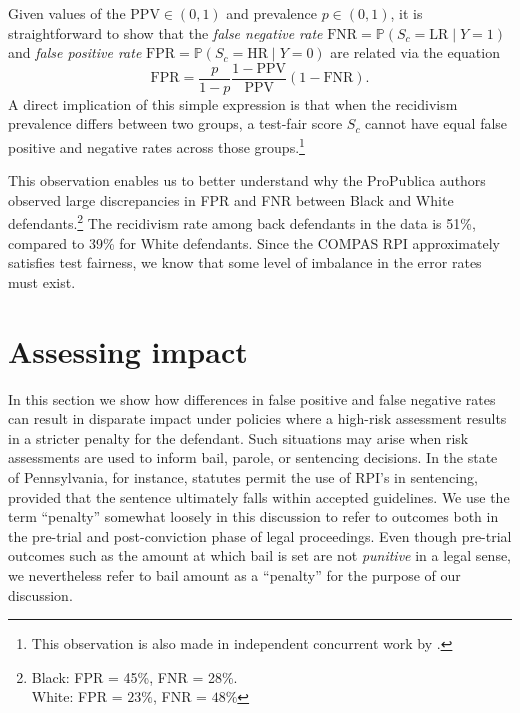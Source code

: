 \documentclass[11pt, svgnames, twocolumn]{article}
\renewcommand{\P}{\mathbb{P}}
\newcommand{\ppv}{\mathrm{PPV}}
\newcommand{\fpr}{\mathrm{FPR}}
\newcommand{\fnr}{\mathrm{FNR}}
\numberwithin{equation}{section}
\theoremstyle{plain}
\theoremstyle{definition}
\numberwithin{theorem}{section}
\numberwithin{prop}{section}
\numberwithin{corollary}{section}
\numberwithin{definition}{section}
\begin{document}
Given values of the $\ppv \in (0,1)$ and prevalence $p \in (0,1)$, it is straightforward to show that the \emph{false negative rate} \mbox{$\fnr = \P(S_c = \text{LR} \mid Y = 1)$} and \emph{false positive rate} \mbox{$\fpr = \P(S_c = \text{HR} \mid Y = 0)$} are related via the equation
\begin{equation}
  \fpr = \frac{p}{1 - p} \frac{1 - \ppv}{\ppv} ( 1 - \fnr).  
  \label{eq:fpr_fnr}
\end{equation}
A direct implication of this simple expression is that when the recidivism prevalence differs between two groups, a test-fair score $S_c$ cannot have equal false positive and negative rates across those groups.\footnote{This observation is also made in independent concurrent work by \citet{kleinberg2016inherent}. }  
  
This observation enables us to better understand why the ProPublica authors observed  large discrepancies in FPR and FNR between Black and White defendants.\footnote{Black: FPR = 45\%, FNR = 28\%. \\  White: FPR = $23\%$, FNR = $48\%$ }  The recidivism rate among back defendants in the data is 51\%, compared to 39\% for White defendants.  Since the COMPAS RPI approximately satisfies test fairness, we know that some level of imbalance in the error rates must exist.

\section{Assessing impact}

\vspace{-0.25em}

In this section we show how differences in false positive and false negative rates can result in disparate impact under policies where a high-risk assessment results in a stricter penalty for the defendant.  Such situations may arise when risk assessments are used to inform bail, parole, or sentencing decisions.  In the state of Pennsylvania, for instance, statutes permit the use of RPI's in sentencing, provided that the sentence ultimately falls within accepted guidelines.  We use the term ``penalty'' somewhat loosely in this discussion to refer to outcomes both in the pre-trial and post-conviction phase of legal proceedings.  Even though pre-trial outcomes such as the amount at which bail is set are not \emph{punitive} in a legal sense, we nevertheless refer to bail amount as a ``penalty'' for the purpose of our discussion. 
\end{document}
